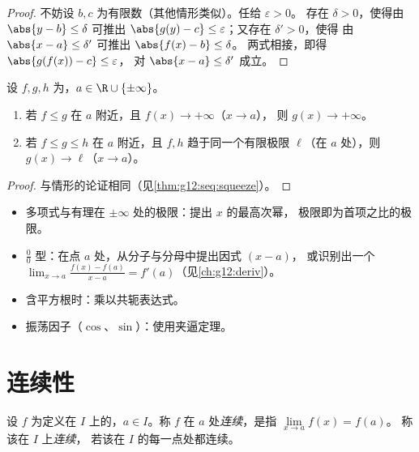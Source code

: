 \begin{proof}
不妨设 $b, c$ 为有限数（其他情形类似）。任给 $\varepsilon > 0$。
存在 $\delta > 0$，使得由 $\abs{y - b} \leq \delta$ 可推出
$\abs{g(y) - c} \leq \varepsilon$；又存在 $\delta' > 0$，使得
由 $\abs{x - a} \leq \delta'$ 可推出 $\abs{f(x) - b} \leq \delta$。
两式相接，即得 $\abs{g(f(x)) - c} \leq \varepsilon$，
对 $\abs{x - a} \leq \delta'$ 成立。
\end{proof}

\begin{theorem}[比较与夹逼]\label{thm:g12:limcont:squeeze}
设 $f, g, h$ 为，$a \in \R \cup \{\pm\infty\}$。
\begin{enumerate}
  \item 若 $f \leq g$ 在 $a$ 附近，且 $f(x) \to +\infty$（$x \to a$），
        则 $g(x) \to +\infty$。
  \item 若 $f \leq g \leq h$ 在 $a$ 附近，且 $f, h$ 趋于同一个有限极限
        $\ell$（在 $a$ 处），则 $g(x) \to \ell$（$x \to a$）。
\end{enumerate}
\end{theorem}

\begin{proof}
与情形的论证相同（见\cref{thm:g12:seq:squeeze}）。
\end{proof}

\begin{method}[极限的计算方法]\label{met:g12:limcont:limits}
\begin{itemize}
  \item 多项式与有理在 $\pm\infty$ 处的极限：提出
        $x$ 的最高次幂，
        极限即为首项之比的极限。
  \item $\frac{0}{0}$ 型：在点 $a$ 处，从分子与分母中提出因式 $(x-a)$，
        或识别出一个
        $\lim_{x\to a}\frac{f(x)-f(a)}{x-a} = f'(a)$（见\cref{ch:g12:deriv}）。
  \item 含平方根时：乘以共轭表达式。
  \item 振荡因子（$\cos$、$\sin$）：使用夹逼定理。
\end{itemize}
\end{method}

\section{连续性}

\begin{definition}[连续性]\label{def:g12:limcont:continuity}
设 $f$ 为定义在 $I$ 上的，$a \in I$。称 $f$ 在
$a$ 处\emph{连续}，是指 $\lim\limits_{x \to a} f(x) = f(a)$。
称该在 $I$ 上\emph{连续}，
若该在 $I$ 的每一点处都连续。
\end{definition}

